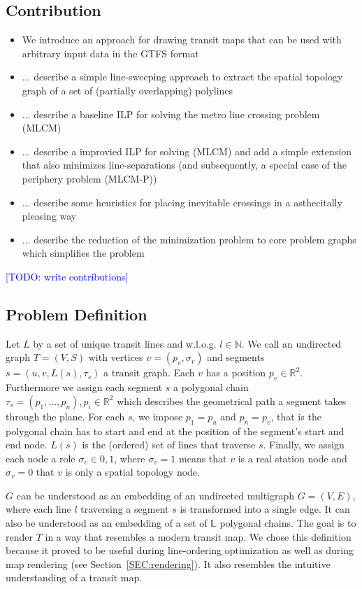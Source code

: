 \documentclass{llncs}
\newcommand\todo[1]{\textcolor{blue}{[TODO: #1]}}
\begin{document}
%
\subsection{Contribution}\label{SEC:contrib}
%
\begin{itemize}
	\item We introduce an approach for drawing transit maps that can be used with arbitrary input data in the GTFS format
	\item ... describe a simple line-sweeping approach to extract the spatial topology graph of a set of (partially overlapping) polylines
	\item ... describe a baseline ILP for solving the metro line crossing problem (MLCM)
	\item ... describe a improvied ILP for solving (MLCM) and add a simple extension that also minimizes line-separations (and subsequently, a special case of the periphery problem (MLCM-P))
	\item ... describe some heuristics for placing inevitable crossings in a asthecitally pleasing way
	\item ... describe the reduction of the minimization problem to core problem graphs which simplifies the problem
\end{itemize}

\todo{write contributions}

%
\subsection{Problem Definition}\label{SEC:def}
%
Let $L$ by a set of unique transit lines and w.l.o.g. $l \in \mathbb{N}$. We call an undirected graph $T = (V, S)$ with vertices $v = (p_v, \sigma_v)$ and segments $s = (u, v, L(s), \tau_s)$ a transit graph. Each $v$ has a position $p_v \in \mathbb{R}^2$. Furthermore we assign each segment $s$ a polygonal chain $\tau_s = (p_1, ..., p_n), p_i \in \mathbb{R}^2$ which describes the geometrical path a segment takes through the plane. For each $s$, we impose $p_1 = p_u$ and $p_n = p_v$, that is the polygonal chain has to start and end at the position of the segment's start and end node. $L(s)$ is the (ordered) set of lines that traverse $s$. Finally, we assign each node a role $\sigma_v \in {0, 1}$, where $\sigma_v = 1$ means that $v$ is a real station node and $\sigma_v = 0$ that $v$ is only a spatial topology node.

$G$ can be understood as an embedding of an undirected multigraph $G = (V, E)$, where each line $l$ traversing a segment $s$ is transformed into a single edge. It can also be understood as an embedding of a set of $\mathbb{L}$ polygonal chains.
The goal is to render $T$ in a way that resembles a modern transit map.
We chose this definition because it proved to be useful during line-ordering optimization as well as during map rendering (see Section~\ref{SEC:rendering}). It also resembles the intuitive understanding of a transit map.
\end{document}
